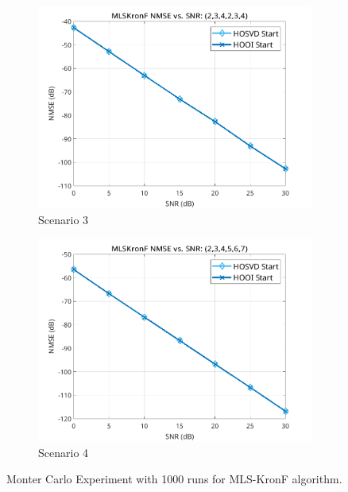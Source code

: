 \documentclass[a4paper,10pt]{article}
\begin{document}
\begin{figure}
        \begin{subfigure}[b]{0.475\textwidth}   
            \centering 
            \includegraphics[width=\textwidth]{figs/hw10a3.png} 
            \caption[]%
            {{\small Scenario 3}}    
            \label{fig:hw10a3} 
        \end{subfigure}
        \hfill
        \begin{subfigure}[b]{0.475\textwidth}   
            \centering 
            \includegraphics[width=\textwidth]{figs/hw10a4.png} 
            \caption[]%
            {{\small Scenario 4}}    
            \label{fig:hw10a4} 
        \end{subfigure}
        \caption[Monter Carlo Experiment with 1000 runs for MLS-KronF algorithm.]
        {\small Monter Carlo Experiment with 1000 runs for MLS-KronF algorithm.} 
        \label{fig:mean and std of nets}
    \end{figure}
\end{document}
